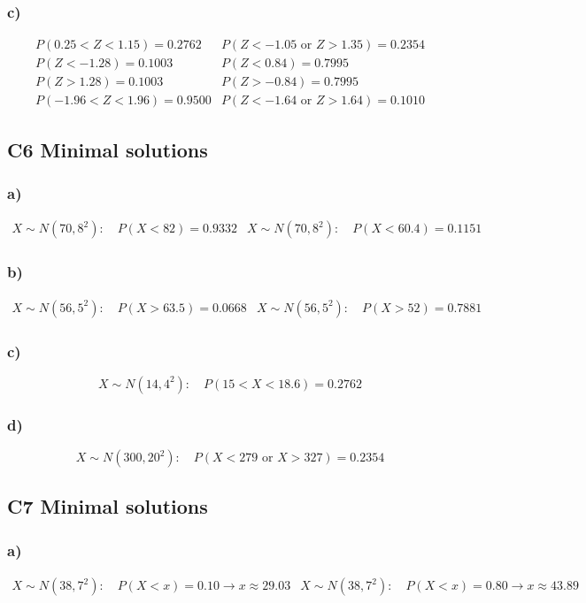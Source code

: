 \subsubsection*{c)}
\[
\begin{array}{ll}
	P(0.25<Z<1.15)=0.2762
	&
	P(Z<-1.05\text{ or }Z>1.35)=0.2354
	\\[0.2cm]
	P(Z<-1.28)=0.1003
	&
	P(Z<0.84)=0.7995
	\\[0.2cm]
	P(Z>1.28)=0.1003
	&
	P(Z>-0.84)=0.7995
	\\[0.2cm]
	P(-1.96<Z<1.96)=0.9500
	&
	P(Z<-1.64\text{ or }Z>1.64)=0.1010
\end{array}
\]

\subsection{C6 Minimal solutions}

\subsubsection*{a)}
\[
\begin{array}{ll}
	X\sim N(70,8^2):\quad P(X<82)=0.9332
	&
	X\sim N(70,8^2):\quad P(X<60.4)=0.1151
\end{array}
\]

\subsubsection*{b)}
\[
\begin{array}{ll}
	X\sim N(56,5^2):\quad P(X>63.5)=0.0668
	&
	X\sim N(56,5^2):\quad P(X>52)=0.7881
\end{array}
\]

\subsubsection*{c)}
\[
X\sim N(14,4^2):\quad P(15<X<18.6)=0.2762
\]

\subsubsection*{d)}
\[
X\sim N(300,20^2):\quad P(X<279\text{ or }X>327)=0.2354
\]

\subsection{C7 Minimal solutions}

\subsubsection*{a)}
\[
\begin{array}{ll}
	X\sim N(38,7^2):\quad P(X<x)=0.10 \longrightarrow x\approx 29.03
	&
	X\sim N(38,7^2):\quad P(X<x)=0.80 \longrightarrow x\approx 43.89
\end{array}
\]

